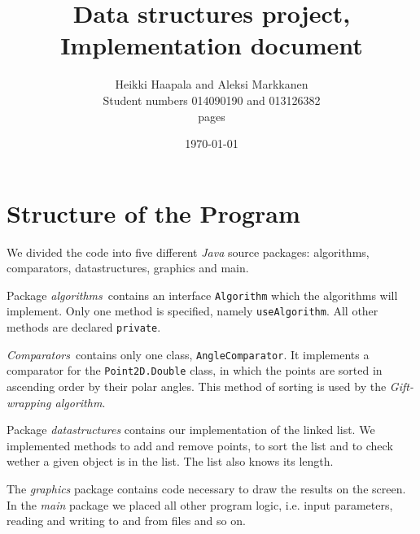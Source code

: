 \documentclass[a4paper,12pt,leqno,titlepage]{article}
\begin{document}
\begin{titlepage}
\title{Data structures project, \\
Implementation document}
\author{Heikki Haapala and Aleksi Markkanen\\
Student numbers 014090190 and 013126382\\
\pageref{LastPage} pages}
\date{\today}
\end{titlepage}
\maketitle
\pagebreak
\tableofcontents
\pagebreak

\section{Structure of the Program}
We divided the code into five different \emph{Java} source packages: algorithms, comparators, datastructures, graphics and main.

Package \emph{algorithms} contains an interface \texttt{Algorithm} which the algorithms will implement.
Only one method is specified, namely \texttt{useAlgorithm}.
All other methods are declared \texttt{private}.

\emph{Comparators} contains only one class, \texttt{AngleComparator}.
It implements a comparator for the \texttt{Point2D.Double} class, in which the points are sorted in ascending order by their polar angles.
This method of sorting is used by the \emph{Gift-wrapping algorithm}.

Package \emph{datastructures} contains our implementation of the linked list.
We implemented methods to add and remove points, to sort the list and to check wether a given object is in the list.
The list also knows its length.

The \emph{graphics} package contains code necessary to draw the results on the screen.
In the \emph{main} package we placed all other program logic, i.e. input parameters, reading and writing to and from files and so on.
\end{document}
